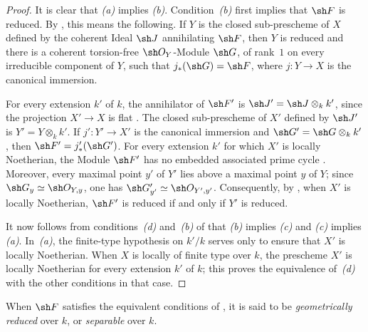 \begin{proof}
It is clear that \emph{(a)} implies \emph{(b)}.
Condition~\emph{(b)} first implies that $\sh F$ is reduced.
By , this means the following.
If $Y$ is the closed sub-prescheme of $X$ defined by the coherent
Ideal $\sh J$ annihilating $\sh F$, then $Y$ is reduced and there is a
coherent torsion-free $\sh O_Y$-Module $\sh G$, of rank~$1$ on every
irreducible component of $Y$, such that
$j_*(\sh G)=\sh F$, where $j:Y\to X$ is the canonical immersion.

For every extension $k'$ of $k$, the annihilator of $\sh F'$ is
$\sh J'=\sh J\otimes_k k'$, since the projection $X'\to X$ is flat
.
The closed sub-prescheme of $X'$ defined by $\sh J'$ is
$Y'=Y\otimes_k k'$.
If $j':Y'\to X'$ is the canonical immersion and
$\sh G'=\sh G\otimes_k k'$, then
$\sh F'=j'_*(\sh G')$.
For every extension $k'$ for which $X'$ is locally Noetherian, the
Module $\sh F'$ has no embedded associated prime cycle
.
Moreover, every maximal point $y'$ of $Y'$ lies above a maximal point
$y$ of $Y$; since
$\sh G_y\simeq\sh O_{Y,y}$, one has
$\sh G'_{y'}\simeq\sh O_{Y',y'}$.
Consequently, by , when $X'$ is locally Noetherian,
$\sh F'$ is reduced if and only if $Y'$ is reduced.

It now follows from conditions~\emph{(d)} and~\emph{(b)} of
 that \emph{(b)} implies \emph{(c)} and
\emph{(c)} implies \emph{(a)}.
In~\emph{(a)}, the finite-type hypothesis on $k'/k$ serves only to
ensure that $X'$ is locally Noetherian.
When $X$ is locally of finite type over $k$, the prescheme $X'$ is
locally Noetherian for every extension $k'$ of $k$; this proves the
equivalence of~\emph{(d)} with the other conditions in that case.
\end{proof}

\begin{definition}[4.6.17]
\label{IV.4.6.17}
When $\sh F$ satisfies the equivalent conditions of
, it is said to be \emph{geometrically reduced} over
$k$, or \emph{separable} over $k$.
\end{definition}

